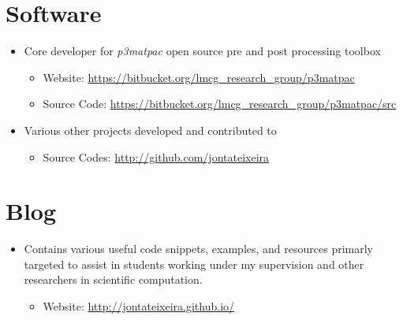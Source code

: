\section*{Software}

\begin{itemize}
  \item Core developer for \emph{p3matpac} open source pre and post processing toolbox
  \begin{itemize}
    \item Website: \href{https://bitbucket.org/lmcg_research_group/p3matpac}{https://bitbucket.org/lmcg\_research\_group/p3matpac}
    \item Source Code: \href{https://bitbucket.org/lmcg_research_group/p3matpac/src}{https://bitbucket.org/lmcg\_research\_group/p3matpac/src}
  \end{itemize}
  \item Various other projects developed and contributed to
  \begin{itemize}
    \item Source Codes: \href{http://github.com/jontateixeira}{http://github.com/jontateixeira}
  \end{itemize}
\end{itemize}

\section*{Blog}

\begin{itemize}
  \item Contains various useful code snippets, examples, and resources primarly targeted to assist in students working under my supervision and other researchers in scientific computation.
  \begin{itemize}
    \item Website: \href{http://jontateixeira.github.io/}{http://jontateixeira.github.io/}
  \end{itemize}
\end{itemize}
